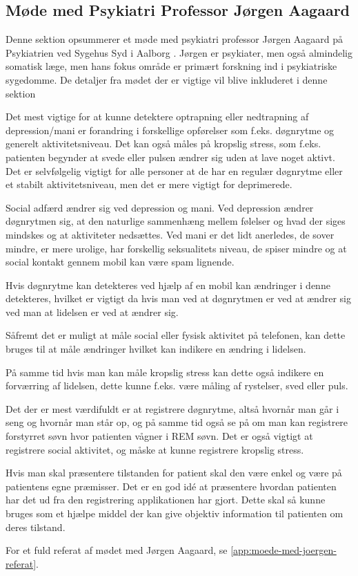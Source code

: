 \subsection{Møde med Psykiatri Professor Jørgen Aagaard}\label{sec:moede-med-joergen}
Denne sektion opsummerer et møde med psykiatri professor Jørgen Aagaard på Psykiatrien ved Sygehus Syd i Aalborg \citep{misc:jorgen-aagaard}. 
Jørgen er psykiater, men også almindelig somatisk læge, men hans fokus område er primært forskning ind i psykiatriske sygedomme.
De detaljer fra mødet der er vigtige vil blive inkluderet i denne sektion

Det mest vigtige for at kunne detektere optrapning eller nedtrapning af depression/mani er forandring i forskellige opførelser som f.eks. døgnrytme og generelt aktivitetsniveau. Det kan også måles på kropslig stress, som f.eks. patienten begynder at svede eller pulsen ændrer sig uden at lave noget aktivt. 
Det er selvfølgelig vigtigt for alle personer at de har en regulær døgnrytme eller et stabilt aktivitetsniveau, men det er mere vigtigt for deprimerede.

Social adfærd ændrer sig ved depression og mani.
Ved depression ændrer døgnrytmen sig, at den naturlige sammenhæng mellem følelser og hvad der siges mindskes og at aktiviteter nedsættes.
Ved mani er det lidt anerledes, de sover mindre, er mere urolige, har forskellig seksualitets niveau, de spiser mindre og at social kontakt gennem mobil kan være spam lignende. 

Hvis døgnrytme kan detekteres ved hjælp af en mobil kan ændringer i denne detekteres, hvilket er vigtigt da hvis man ved at døgnrytmen er ved at ændrer sig ved man at lidelsen er ved at ændrer sig.

Såfremt det er muligt at måle social eller fysisk aktivitet på telefonen, kan dette bruges til at måle ændringer hvilket kan indikere en ændring i lidelsen.

På samme tid hvis man kan måle kropslig stress kan dette også indikere en forværring af lidelsen, dette kunne f.eks. være måling af rystelser, sved eller puls. 

Det der er mest værdifuldt er at registrere døgnrytme, altså hvornår man går i seng og hvornår man står op, og på samme tid også se på om man kan registrere forstyrret søvn hvor patienten vågner i REM søvn. 
Det er også vigtigt at registrere social aktivitet, og måske at kunne registrere kropslig stress.

Hvis man skal præsentere tilstanden for patient skal den være enkel og være på patientens egne præmisser. Det er en god idé at præsentere hvordan patienten har det ud fra den registrering applikationen har gjort. Dette skal så kunne bruges som et hjælpe middel der kan give objektiv information til patienten om deres tilstand.

For et fuld referat af mødet med Jørgen Aagaard, se \cref{app:moede-med-joergen-referat}.
